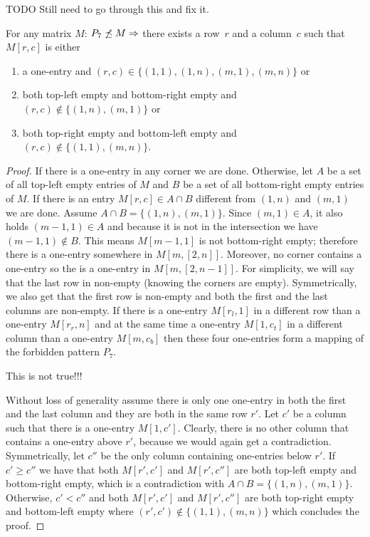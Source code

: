 TODO Still need to go through this and fix it.
\begin{lemma}
\label{lemma:p33}
For any matrix $M$: $P_7\not\preceq M\Rightarrow$ there exists a row~$r$ and a column~$c$ such that $M[r,c]$ is either
\begin{enumerate}
\item a one-entry and $(r,c)\in\{(1,1),(1,n),(m,1),(m,n)\}$ or
\item both top-left empty and bottom-right empty and $(r,c)\not\in\{(1,n),(m,1)\}$ or
\item both top-right empty and bottom-left empty and $(r,c)\not\in\{(1,1),(m,n)\}$.
\end{enumerate}
\end{lemma}
\begin{proof}
If there is a one-entry in any corner we are done. Otherwise, let $A$ be a set of all top-left empty entries of $M$ and $B$ be a set of all bottom-right empty entries of $M$. If there is an entry $M[r,c]\in A\cap B$ different from $(1,n)$ and $(m,1)$ we are done. Assume $A\cap B=\{(1,n),(m,1)\}$. Since $(m,1)\in A$, it also holds $(m-1,1)\in A$ and because it is not in the intersection we have $(m-1,1)\not\in B$. This means $M[m-1,1]$ is not bottom-right empty; therefore there is a one-entry somewhere in $M[{m},[2,n]]$. Moreover, no corner contains a one-entry so the is a one-entry in $M[{m},[2,n-1]]$. For simplicity, we will say that the last row in non-empty (knowing the corners are empty). Symmetrically, we also get that the first row is non-empty and both the first and the last columns are non-empty. If there is a one-entry $M[r_l,1]$ in a different row than a one-entry $M[r_r,n]$ and at the same time a one-entry $M[1,c_t]$ in a different column than a one-entry $M[m,c_b]$ then these four one-entries form a mapping of the forbidden pattern $P_7$.

This is not true!!!

Without loss of generality assume there is only one one-entry in both the first and the last column and they are both in the same row $r'$. Let $c'$ be a column such that there is a one-entry $M[1,c']$. Clearly, there is no other column that contains a one-entry above $r'$, because we would again get a contradiction. Symmetrically, let $c''$ be the only column containing one-entries below $r'$. If $c'\geq c''$ we have that both $M[r',c']$ and $M[r',c'']$ are both top-left empty and bottom-right empty, which is a contradiction with $A\cap B=\{(1,n),(m,1)\}$. Otherwise, $c'<c''$ and both $M[r',c']$ and $M[r',c'']$ are both top-right empty and bottom-left empty where $(r',c')\not\in\{(1,1),(m,n)\}$ which concludes the proof.
\end{proof}

